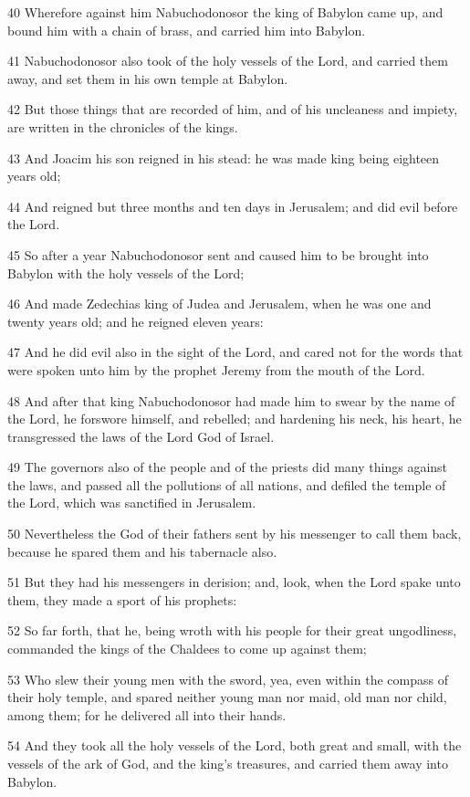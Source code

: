 \par 40 Wherefore against him Nabuchodonosor the king of Babylon came up, and bound him with a chain of brass, and carried him into Babylon.
\par 41 Nabuchodonosor also took of the holy vessels of the Lord, and carried them away, and set them in his own temple at Babylon.
\par 42 But those things that are recorded of him, and of his uncleaness and impiety, are written in the chronicles of the kings.
\par 43 And Joacim his son reigned in his stead: he was made king being eighteen years old;
\par 44 And reigned but three months and ten days in Jerusalem; and did evil before the Lord.
\par 45 So after a year Nabuchodonosor sent and caused him to be brought into Babylon with the holy vessels of the Lord;
\par 46 And made Zedechias king of Judea and Jerusalem, when he was one and twenty years old; and he reigned eleven years:
\par 47 And he did evil also in the sight of the Lord, and cared not for the words that were spoken unto him by the prophet Jeremy from the mouth of the Lord.
\par 48 And after that king Nabuchodonosor had made him to swear by the name of the Lord, he forswore himself, and rebelled; and hardening his neck, his heart, he transgressed the laws of the Lord God of Israel.
\par 49 The governors also of the people and of the priests did many things against the laws, and passed all the pollutions of all nations, and defiled the temple of the Lord, which was sanctified in Jerusalem.
\par 50 Nevertheless the God of their fathers sent by his messenger to call them back, because he spared them and his tabernacle also.
\par 51 But they had his messengers in derision; and, look, when the Lord spake unto them, they made a sport of his prophets:
\par 52 So far forth, that he, being wroth with his people for their great ungodliness, commanded the kings of the Chaldees to come up against them;
\par 53 Who slew their young men with the sword, yea, even within the compass of their holy temple, and spared neither young man nor maid, old man nor child, among them; for he delivered all into their hands.
\par 54 And they took all the holy vessels of the Lord, both great and small, with the vessels of the ark of God, and the king's treasures, and carried them away into Babylon.
